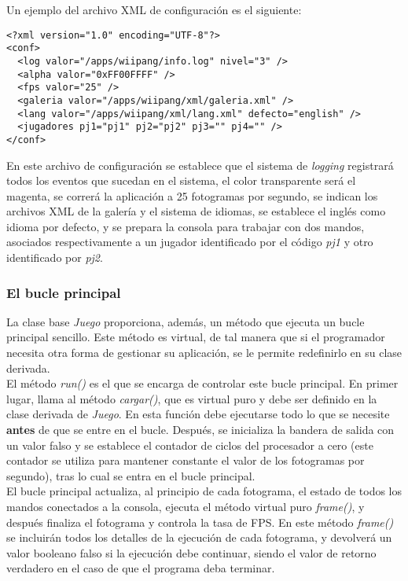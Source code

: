 Un ejemplo del archivo XML de configuración es el siguiente:

\begin{lstlisting}[style=XML]
<?xml version="1.0" encoding="UTF-8"?>
<conf>
  <log valor="/apps/wiipang/info.log" nivel="3" />
  <alpha valor="0xFF00FFFF" />
  <fps valor="25" />
  <galeria valor="/apps/wiipang/xml/galeria.xml" />
  <lang valor="/apps/wiipang/xml/lang.xml" defecto="english" />
  <jugadores pj1="pj1" pj2="pj2" pj3="" pj4="" />
</conf>
\end{lstlisting}

En este archivo de configuración se establece que el sistema de \emph{logging} registrará todos los eventos que sucedan en el sistema, el color transparente será el magenta, se correrá la aplicación a 25 fotogramas por segundo, se indican los archivos XML de la galería y el sistema de idiomas, se establece el inglés como idioma por defecto, y se prepara la consola para trabajar con dos mandos, asociados respectivamente a un jugador identificado por el código \emph{pj1} y otro identificado por \emph{pj2}.\\

\subsubsection{El bucle principal}

La clase base \emph{Juego} proporciona, además, un método que ejecuta un bucle principal sencillo. Este método es virtual, de tal manera que si el programador necesita otra forma de gestionar su aplicación, se le permite redefinirlo en su clase derivada.\\

El método \emph{run()} es el que se encarga de controlar este bucle principal. En primer lugar, llama al método \emph{cargar()}, que es virtual puro y debe ser definido en la clase derivada de \emph{Juego}. En esta función debe ejecutarse todo lo que se necesite \textbf{antes} de que se entre en el bucle. Después, se inicializa la bandera de salida con un valor falso y se establece el contador de ciclos del procesador a cero (este contador se utiliza para mantener constante el valor de los fotogramas por segundo), tras lo cual se entra en el bucle principal.\\

El bucle principal actualiza, al principio de cada fotograma, el estado de todos los mandos conectados a la consola, ejecuta el método virtual puro \emph{frame()}, y después finaliza el fotograma y controla la tasa de FPS. En este método \emph{frame()} se incluirán todos los detalles de la ejecución de cada fotograma, y devolverá un valor booleano falso si la ejecución debe continuar, siendo el valor de retorno verdadero en el caso de que el programa deba terminar.\\

